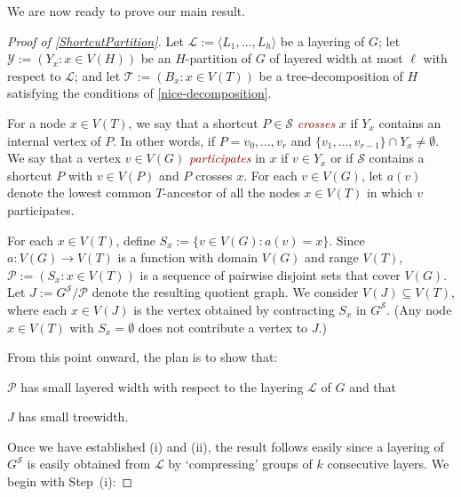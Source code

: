 \documentclass{patmorin}
\theoremstyle{plain}
\theoremstyle{definition}
\newcommand{\defin}[1]{\textcolor{Maroon}{\emph{#1}}}
\newcommand{\note}[2]{\noindent{\color{red}[#1:~#2]}}
\newcommand{\referee}[2]{\noindent\textcolor{blue}{\framebox{\begin{minipage}{\textwidth} Ref \#{#1}: #2\end{minipage}}}}
\newcommand{\PP}{\mathcal{P}}
\renewcommand{\SS}{\mathcal{S}}
\begin{document}


We are now ready to prove our main result.


\begin{proof}[Proof of \cref{ShortcutPartition}]
Let $\mathcal{L}:=\langle L_1,\ldots,L_h\rangle$ be a layering of $G$; let $\mathcal{Y}:=(Y_x: x\in V(H))$ be an $H$-partition of $G$ of layered width at most $\ell$ with respect to $\mathcal{L}$; and let $\mathcal{T}:=(B_x:x\in V(T))$ be a tree-decomposition of $H$ satisfying the conditions of \cref{nice-decomposition}.

For a node $x\in V(T)$, we say that a shortcut $P\in\SS$ \defin{crosses} $x$ if $Y_x$ contains an internal vertex of $P$.  In other words, if $P=v_0,\ldots,v_r$ and $\{v_1,\ldots,v_{r-1}\}\cap Y_x\neq\emptyset$.  We say that a vertex $v\in V(G)$ \defin{participates} in $x$ if $v\in Y_x$ or if $\SS$ contains a shortcut $P$ with $v\in V(P)$ and $P$ crosses $x$.  For each $v\in V(G)$, let $a(v)$ denote the lowest common $T$-ancestor of all the nodes $x\in V(T)$ in which $v$ participates.

For each $x\in V(T)$, define $S_x := \{v\in V(G): a(v)= x\}$. Since $a:V(G)\to V(T)$ is a function with domain $V(G)$ and range $V(T)$, $\PP:=(S_x : x\in V(T))$ is a sequence of pairwise disjoint sets that cover $V(G)$. Let $J:=G^\SS/\PP$ denote the resulting quotient graph. We consider $V(J)\subseteq V(T)$, where each $x\in V(J)$ is the vertex obtained by contracting $S_x$ in $G^{\SS}$. (Any node $x\in V(T)$ with $S_x=\emptyset$ does not contribute a vertex to $J$.)

From this point onward, the plan is to show that:
\begin{compactenum}[(i)]
  \item $\PP$ has small layered width with respect to the layering $\mathcal{L}$ of $G$ and that
  \item $J$ has small treewidth.
\end{compactenum}
Once we have established (i) and (ii), the result follows easily since a layering of $G^\SS$ is easily obtained from $\mathcal{L}$ by `compressing' groups of $k$ consecutive layers.  We begin with Step~(i):


\end{proof}
\end{document}

